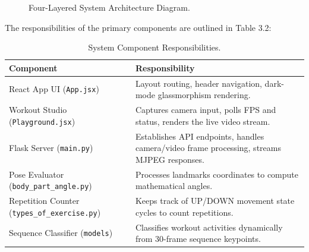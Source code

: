 \begin{figure}[h]
\centering
{}
\caption{Four-Layered System Architecture Diagram.}
\label{fig:system_architecture}
\end{figure}

The responsibilities of the primary components are outlined in Table 3.2:
\begin{table}[h]
\centering
\begin{tabular}{|p{4.5cm}|p{11.3cm}|}
\hline
\textbf{Component} & \textbf{Responsibility} \\ \hline
React App UI (\texttt{App.jsx}) & Layout routing, header navigation, dark-mode glassmorphism rendering. \\ \hline
Workout Studio (\texttt{Playground.jsx}) & Captures camera input, polls FPS and status, renders the live video stream. \\ \hline
Flask Server (\texttt{main.py}) & Establishes API endpoints, handles camera/video frame processing, streams MJPEG responses. \\ \hline
Pose Evaluator (\texttt{body\_part\_angle.py}) & Processes landmarks coordinates to compute mathematical angles. \\ \hline
Repetition Counter (\texttt{types\_of\_exercise.py}) & Keeps track of UP/DOWN movement state cycles to count repetitions. \\ \hline
Sequence Classifier (\texttt{models}) & Classifies workout activities dynamically from 30-frame sequence keypoints. \\ \hline
\end{tabular}
\caption{System Component Responsibilities.}
\label{tab:component_responsibilities}
\end{table}

